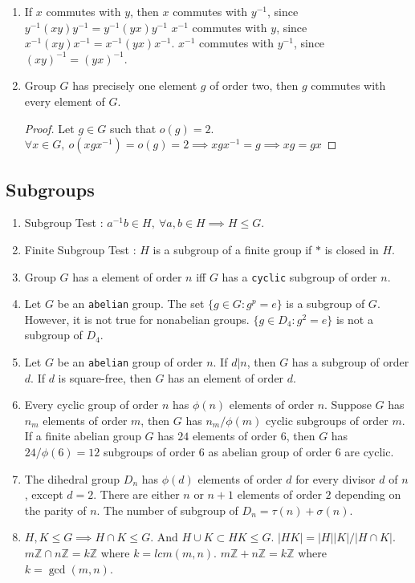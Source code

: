 \begin{enumerate}
	\item If $x$ commutes with $y$, then
		\subitem $x$ commutes with $y^{-1}$, since $y^{-1}(xy)y^{-1} = y^{-1}(yx)y^{-1}$
		\subitem $x^{-1}$ commutes with $y$, since $x^{-1}(xy)x^{-1} = x^{-1}(yx)x^{-1}$.
		\subitem $x^{-1}$ commutes with $y^{-1}$, since $(xy)^{-1} = (yx)^{-1}$.
	\item Group $G$ has precisely one element $g$ of order two, then $g$ commutes with every element of $G$.
	\begin{proof}
		Let $g \in G$ such that $o(g) = 2$.\\
		$\forall x \in G,\ o(xgx^{-1}) = o(g) = 2 \implies xgx^{-1} = g \implies xg = gx$
	\end{proof}
\end{enumerate}

\subsection{Subgroups}
\begin{enumerate}
	\item Subgroup Test : $a^{-1}b \in H,\ \forall a,b \in H \implies H \le G$.
	\item Finite Subgroup Test : $H$ is a subgroup of a finite group if $\ast$ is closed in $H$.
	\item Group $G$ has a element of order $n$ iff $G$ has a \texttt{cyclic} subgroup of order $n$. 
	\item Let $G$ be an \texttt{abelian} group. The set $\{ g \in G : g^p = e \}$ is a subgroup of $G$.
	However, it is not true for nonabelian groups.
	$\{ g \in D_4 : g^2 = e \}$ is not a subgroup of $D_4$.
	\item Let $G$ be an \texttt{abelian} group of order $n$. If $d|n$, then $G$ has a subgroup of order $d$. If $d$ is square-free, then $G$ has an element of order $d$.
	\item Every cyclic group of order $n$ has $\phi(n)$ elements of order $n$.
		Suppose $G$ has $n_m$ elements of order $m$, then $G$ has $n_m/\phi(m)$ cyclic subgroups of order $m$.
		\subitem If a finite abelian group $G$ has $24$ elements of order $6$, then $G$ has $24/\phi(6) = 12$ subgroups of order $6$ as abelian group of order $6$ are cyclic.
	\item The dihedral group $D_n$ has $\phi(d)$ elements of order $d$ for every divisor $d$ of $n$, except $d=2$. There are either $n$ or $n+1$ elements of order $2$ depending on the parity of $n$.
	The number of subgroup of $D_n = \tau(n)+\sigma(n)$.
	\item $H,K \le G \implies H \cap K \le G$. And $H \cup K \subset HK \le G$.
		\subitem $|HK| = |H| |K| / |H \cap K|$.
		\subitem $m\mathbb{Z} \cap n\mathbb{Z} = k\mathbb{Z}$ where $k = lcm(m,n)$.
		\subitem $m\mathbb{Z} + n\mathbb{Z} = k\mathbb{Z}$ where $k = \gcd(m,n)$.
\end{enumerate}

